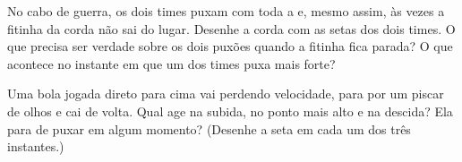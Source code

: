 \begin{exercise}[$\star\star$]\label{exo:g2:pushes-and-pulls:9}
No cabo de guerra, os dois times puxam com toda a  e, mesmo
assim, às vezes a fitinha da corda não sai do lugar. Desenhe a corda
com as setas dos dois times. O que precisa ser verdade sobre os dois
puxões quando a fitinha fica parada? O que acontece no instante em
que um dos times puxa mais forte?
\end{exercise}

\begin{exercise}[$\star\star$]\label{exo:g2:pushes-and-pulls:10}
Uma bola jogada direto para cima vai perdendo velocidade, para por um
piscar de olhos e cai de volta. Qual  age na subida, no ponto
mais alto e na descida? Ela para de puxar em algum momento? (Desenhe
a seta em cada um dos três instantes.)
\end{exercise}
